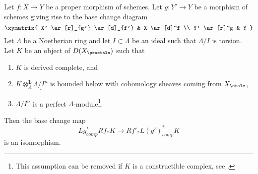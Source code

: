 \begin{theorem}
\label{theorem-proper-base-change}
Let $f : X \to Y$ be a proper morphism of schemes. Let $g : Y' \to Y$ be
a morphism of schemes giving rise to the base change diagram
$$
\xymatrix{
X' \ar[r]_{g'} \ar[d]_{f'} & X \ar[d]^f \\
Y' \ar[r]^g & Y
}
$$
Let $\Lambda$ be a Noetherian ring and let $I \subset \Lambda$ be an ideal
such that $\Lambda/I$ is torsion. Let $K$ be an object
of $D(X_\proetale)$ such that
\begin{enumerate}
\item $K$ is derived complete, and
\item $K \otimes_\Lambda^\mathbf{L} \underline{\Lambda/I^n}$ is
bounded below with cohomology sheaves coming from $X_\etale$,
\item $\Lambda/I^n$ is a perfect $\Lambda$-module\footnote{This assumption
can be removed if $K$ is a constructible complex, see \cite{BS}.}.
\end{enumerate}
Then the base change map
$$
Lg_{comp}^*Rf_*K \longrightarrow Rf'_*L(g')^*_{comp}K
$$
is an isomorphism.
\end{theorem}

